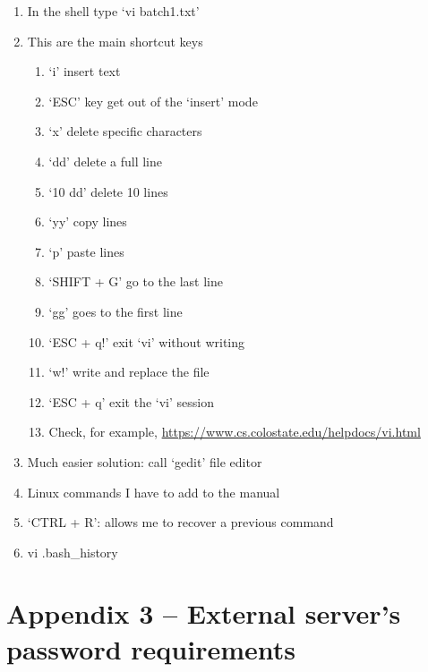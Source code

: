 \documentclass[]{book}
\begin{document}
\begin{enumerate}
\def\labelenumi{\arabic{enumi}.}
\item
  In the shell type `vi batch1.txt'
\item
  This are the main shortcut keys

  \begin{enumerate}
  \def\labelenumii{\alph{enumii}.}
  \item
    `i' insert text
  \item
    `ESC' key get out of the `insert' mode
  \item
    `x' delete specific characters
  \item
    `dd' delete a full line
  \item
    `10 dd' delete 10 lines
  \item
    `yy' copy lines
  \item
    `p' paste lines
  \item
    `SHIFT + G' go to the last line
  \item
    `gg' goes to the first line
  \item
    `ESC + q!' exit `vi' without writing
  \item
    `w!' write and replace the file
  \item
    `ESC + q' exit the `vi' session
  \item
    Check, for example,
    \url{https://www.cs.colostate.edu/helpdocs/vi.html}
  \end{enumerate}
\item
  Much easier solution: call `gedit' file editor
\item
  Linux commands I have to add to the manual
\item
  `CTRL + R': allows me to recover a previous command
\item
  vi .bash\_history
\end{enumerate}

\hypertarget{appendix-3-external-servers-password-requirements}{%
\section{\texorpdfstring{{Appendix 3 -- External server's password requirements}}{Appendix 3 -- External server's password requirements}}\label{appendix-3-external-servers-password-requirements}}
\end{document}
